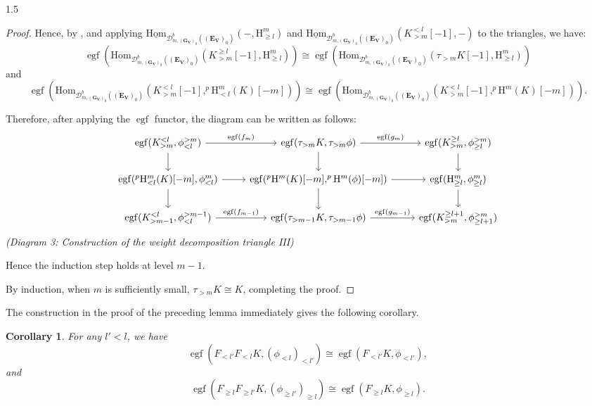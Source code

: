 \documentclass[10pt]{amsart}
\newtheorem{corollary}[theorem]{Corollary}
\begin{document}
\begin{spacing}{1.5}
\begin{proof}
Hence, by \cite[Remark 5.3.5]{Pramod-2021}, and applying $\underline{\mathrm{Hom}}_{\mathcal{D}^b_{m,(\mathbf{G}_{\mathbf{V}})_0}((\mathbf{E}_{\mathbf{V}})_0)}(-,\mathrm{H}^m_{\geq l})$ and $\underline{\mathrm{Hom}}_{\mathcal{D}^b_{m,(\mathbf{G}_{\mathbf{V}})_0}((\mathbf{E}_{\mathbf{V}})_0)}(K_{>m}^{<l}[-1],-)$ to the triangles, we have:
\[
\operatorname{egf}\left(\mathrm{Hom}_{\mathcal{D}^b_{m,(\mathbf{G}_{\mathbf{V}})_0}((\mathbf{E}_{\mathbf{V}})_0)}(K_{>m}^{\geq l}[-1],\mathrm{H}^m_{\geq l})\right)
\cong
\operatorname{egf}\left(\mathrm{Hom}_{\mathcal{D}^b_{m,(\mathbf{G}_{\mathbf{V}})_0}((\mathbf{E}_{\mathbf{V}})_0)}(\tau_{>m}K[-1],\mathrm{H}^m_{\geq l})\right)
\]
and
\[
\operatorname{egf}\left(\mathrm{Hom}_{\mathcal{D}^b_{m,(\mathbf{G}_{\mathbf{V}})_0}((\mathbf{E}_{\mathbf{V}})_0)}(K_{>m}^{<l}[-1],^{p}\mathrm{H}^m_{<l}(K)[-m])\right)
\cong
\operatorname{egf}\left(\mathrm{Hom}_{\mathcal{D}^b_{m,(\mathbf{G}_{\mathbf{V}})_0}((\mathbf{E}_{\mathbf{V}})_0)}(K_{>m}^{<l}[-1],^{p}\mathrm{H}^m(K)[-m])\right).
\]

Therefore, after applying the $\operatorname{egf}$ functor, the diagram can be written as follows:
\[
\begin{tikzcd}
\operatorname{egf}(K_{>m}^{<l},\phi^{>m}_{<l}) \arrow[r, "\operatorname{egf}(f_m)"] \arrow[d] & \operatorname{egf}(\tau_{>m}K,\tau_{>m}\phi) \arrow[r, "\operatorname{egf}(g_m)"] \arrow[d] & \operatorname{egf}(K_{>m}^{\geq l},\phi^{>m}_{\geq l}) \arrow[d] \\
\operatorname{egf}(^{p}\mathrm{H}^m_{<l}(K)[-m],\phi_{<l}^m) \arrow[r] \arrow[d] & \operatorname{egf}(^{p}\mathrm{H}^m(K)[-m], ^{p}\mathrm{H}^m(\phi)[-m]) \arrow[d] \arrow[r] & \operatorname{egf}(\mathrm{H}^m_{\geq l},\phi^m_{\geq l}) \arrow[d] \\
\operatorname{egf}(K_{>m-1}^{<l},\phi^{>m-1}_{<l}) \arrow[r, "\operatorname{egf}(f_{m-1})"] & \operatorname{egf}(\tau_{>m-1}K,\tau_{>m-1}\phi) \arrow[r, "\operatorname{egf}(g_{m-1})"] & \operatorname{egf}(K_{>m}^{\geq l+1},\phi^{>m}_{\geq l+1})
\end{tikzcd}
\]
\emph{(Diagram 3: Construction of the weight decomposition triangle III)}

Hence the induction step holds at level $m-1$.

By induction, when $m$ is sufficiently small, $\tau_{>m}K \cong K$, completing the proof.
\end{proof}
The construction in the proof of the preceding lemma immediately gives the following corollary.

\begin{corollary}\label{corll}
For any $l' < l$, we have
\[
\operatorname{egf}(F_{<l'} F_{<l} K, (\phi_{<l})_{<l'}) \cong \operatorname{egf}(F_{<l'} K, \phi_{<l'}),
\]
and
\[
\operatorname{egf}(F_{\geq l} F_{\geq l'} K, (\phi_{\geq l'})_{\geq l}) \cong \operatorname{egf}(F_{\geq l} K, \phi_{\geq l}).
\]
\end{corollary}


\end{spacing}
\end{document}
